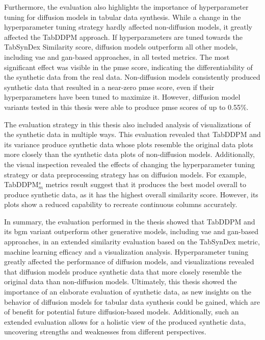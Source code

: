 Furthermore, the evaluation also highlights the importance of hyperparameter tuning for diffusion models in tabular data synthesis.
While a change in the hyperparameter tuning strategy hardly affected non-diffusion models, it greatly affected the TabDDPM approach.  
If hyperparameters are tuned towards the TabSynDex Similarity score, diffusion models outperform all other models, including \gls{vae} and \gls{gan}-based approaches,
in all tested metrics.
The most significant effect was visible in the \gls{pmse} score, indicating the differentiability of the synthetic data from the real data.
Non-diffusion models consistently produced synthetic data that resulted in a near-zero \gls{pmse} score, even if their hyperparameters have been tuned to maximize it.
However, diffusion model variants tested in this thesis were able to produce \gls{pmse} scores of up to 0.55\%.

The evaluation strategy in this thesis also included analysis of visualizations of the synthetic data in multiple ways.
This evaluation revealed that TabDDPM and its variance produce synthetic data whose plots resemble the original data plots more closely than the synthetic data plots of non-diffusion models.
Additionally, the visual inspection revealed the effects of changing the hyperparameter tuning strategy or data preprocessing strategy has on diffusion models.
For example, TabDDPM$^{s}_m$ metrics result suggest that it produces the best model overall to produce synthetic data, as it has the highest overall similarity score.
However, its plots show a reduced capability to recreate continuous columns accurately.

In summary, the evaluation performed in the thesis showed that TabDDPM and its \gls{bgm} variant outperform other generative models, 
including \gls{vae} and \gls{gan}-based approaches, in an extended similarity evaluation based on the TabSynDex metric, 
machine learning efficacy and a visualization analysis.
Hyperparameter tuning greatly affected the performance of diffusion models, and visualizations revealed that diffusion models produce synthetic data that more closely resemble the original data than non-diffusion models.
Ultimately, this thesis showed the importance of an elaborate evaluation of synthetic data, as new insights on the behavior of diffusion models for tabular data synthesis could be gained,
which are of benefit for potential future diffusion-based models.
Additionally, such an extended evaluation allows for a holistic view of the produced synthetic data, uncovering strengths and weaknesses from different perspectives.

